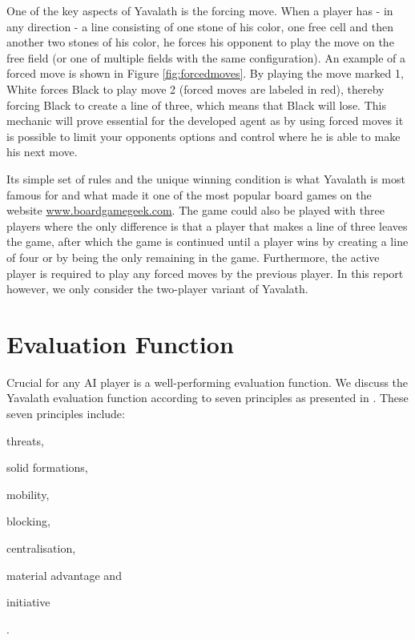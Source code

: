 \documentclass[11pt]{article}
\begin{document}


One of the key aspects of Yavalath is the forcing move. When a player has - in any direction - a line consisting of one stone of his color, one free cell and then another two stones of his color, he forces his opponent to play the move on the free field (or one of multiple fields with the same configuration). An example of a forced move is shown in Figure \ref{fig:forcedmoves}. By playing the move marked 1, White forces Black to play move 2 (forced moves are labeled in red), thereby forcing Black to create a line of three, which means that Black will lose. This mechanic will prove essential for the developed agent as by using forced moves it is possible to limit your opponents options and control where he is able to make his next move.



Its simple set of rules and the unique winning condition is what Yavalath is most famous for and what made it one of the most popular board games on the website \url{www.boardgamegeek.com}. The game could also be played with three players where the only difference is that a player that makes a line of three leaves the game, after which the game is continued until a player wins by creating a line of four or by being the only remaining in the game. Furthermore, the active player is required to play any forced moves by the previous player. In this report however, we only consider the two-player variant of Yavalath.

\section{Evaluation Function}
\label{-sec:evaluationfunction}

Crucial for any AI player is a well-performing evaluation function. We discuss the Yavalath evaluation function according to seven principles as presented in \cite{Winands2004}. These seven principles include: \begin{enumerate*}\item threats, \item solid formations, \item mobility, \item blocking, \item centralisation, \item material advantage and \item initiative\end{enumerate*}.
\end{document}
